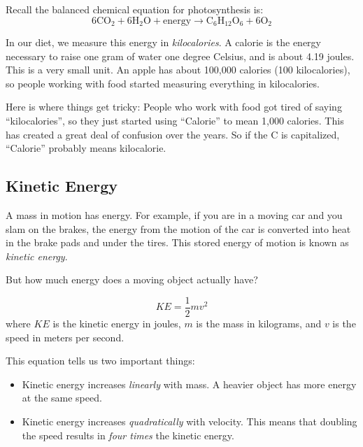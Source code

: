 Recall the balanced chemical equation for photosynthesis is:
\[
6 \text{CO}_2 + 6 \text{H}_2\text{O} + \text{energy} \rightarrow \text{C}_6\text{H}_{12}\text{O}_6 + 6 \text{O}_2
\]


In our diet, we measure this energy in \textit{kilocalories}. A calorie is the 
energy necessary to raise one gram of water one degree Celsius, and is about 
4.19 joules. This is a very small unit. An apple has about 100,000 calories (100 
kilocalories), so people working with food started measuring everything in kilocalories.



Here is where things get tricky: People who work with food got tired of saying 
``kilocalories'', so they just started using ``Calorie'' to mean 1,000 calories. 
This has created a great deal of confusion over the years. So if the C is capitalized,
 ``Calorie'' probably means kilocalorie.

\subsection{Kinetic Energy}
A mass in motion has energy. For example, if you are in a moving car and you slam
on the brakes, the energy from the motion of the car is converted into heat in
the brake pads and under the tires. This stored energy of motion is known as
\emph{kinetic energy}.

But how much energy does a moving object actually have?

\begin{mdframed}[style=important, frametitle={Formula for Kinetic Energy}]
\[
KE = \frac{1}{2} m v^2
\]
where $KE$ is the kinetic energy in joules, $m$ is the mass in kilograms, and
$v$ is the speed in meters per second.
\end{mdframed}

This equation tells us two important things:

\begin{itemize}
  \item Kinetic energy increases \emph{linearly} with mass. A heavier object has
  more energy at the same speed.
  \item Kinetic energy increases \emph{quadratically} with velocity. This means
  that doubling the speed results in \emph{four times} the kinetic energy.
\end{itemize}

